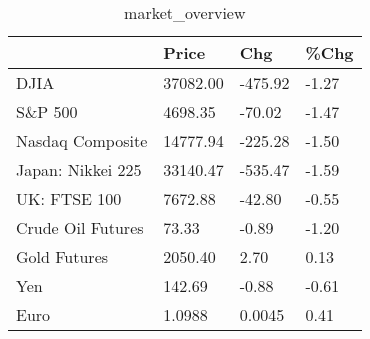 \documentclass{article}%
\begin{document}
%


\begin{table}[htbp]%
\caption{market\_overview}%
\centering%
\begin{adjustbox}{width=1\textwidth}%
\begin{tabular}{llll}
\toprule
                  &    Price &     Chg &  \%Chg \\
\midrule
             DJIA & 37082.00 & -475.92 & -1.27 \\
          S\&P 500 &  4698.35 &  -70.02 & -1.47 \\
 Nasdaq Composite & 14777.94 & -225.28 & -1.50 \\
Japan: Nikkei 225 & 33140.47 & -535.47 & -1.59 \\
     UK: FTSE 100 &  7672.88 &  -42.80 & -0.55 \\
Crude Oil Futures &    73.33 &   -0.89 & -1.20 \\
     Gold Futures &  2050.40 &    2.70 &  0.13 \\
              Yen &   142.69 &   -0.88 & -0.61 \\
             Euro &   1.0988 &  0.0045 &  0.41 \\
\bottomrule
\end{tabular}
%
\end{adjustbox}%
\end{table}

%
\end{document}

